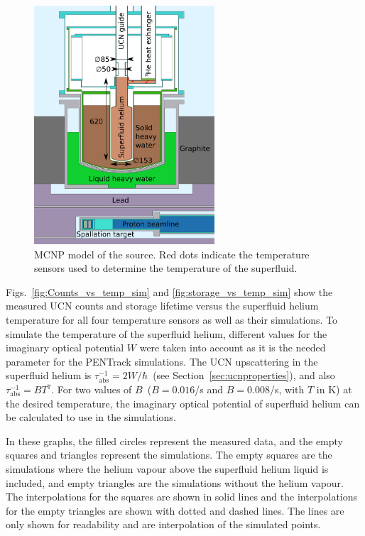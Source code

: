 \begin{figure}[h!]
  \centering
  \includegraphics[width=0.6\textwidth]{MCNPmodel.pdf}
  \caption[MCNP model of the UCN source]{MCNP model of the source. Red
    dots indicate the temperature sensors used to determine the
    temperature of the superfluid.}
  \label{fig:mcnpmodel}
\end{figure}


Figs.~\ref{fig:Counts_vs_temp_sim} and \ref{fig:storage_vs_temp_sim}
show the measured UCN counts and storage lifetime versus the
superfluid helium temperature for all four temperature sensors as well
as their simulations. To simulate the temperature of the superfluid
helium, different values for the imaginary optical potential $W$ were
taken into account as it is the needed parameter for the PENTrack
simulations. The UCN upscattering in the superfluid helium is
$\tau_{\mathrm{abs}}^{-1} = 2W/\hbar$~(see
Section~\ref{sec:ucnproperties}), and also
$\tau_{\mathrm{abs}}^{-1} = B T^7$. For two values of
$B$~($B = 0.016$/s and $B = 0.008$/s, with $T$ in K) at the desired
temperature, the imaginary optical potential of superfluid helium can
be calculated to use in the simulations.



In these graphs, the filled circles represent the measured data, and
the empty squares and triangles represent the simulations.  The empty
squares are the simulations where the helium vapour above the
superfluid helium liquid is included, and empty triangles are the
simulations without the helium vapour. The interpolations for the
squares are shown in solid lines and the interpolations for the empty
triangles are shown with dotted and dashed lines. The lines are only
shown for readability and are interpolation of the simulated points.



